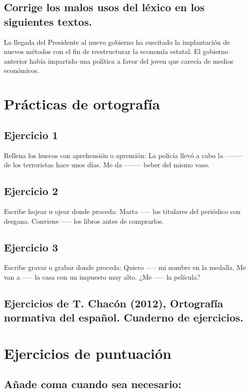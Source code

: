 \documentclass[12pt, a4paper, oneside]{report}
\begin{document}
\section{Corrige los malos usos
  del léxico en los siguientes textos.}
La llegada del Presidente %
al nuevo gobierno ha suscitado %
la implantación de nuevos métodos con el ﬁn de reestructurar
la economía estatal.
El gobierno anterior había impartido una %
política a favor del joven %
que carecía de medios económicos.
\clearpage

\chapter*{Prácticas de ortografía}
\setcounter{chapter}{3}
\setcounter{section}{0}

\section{Ejercicio 1}
Rellena los huecos con
aprehensión o aprensión:
La policía llevó a cabo la --------
de los terroristas hace unos días.
Me da -------- beber del mismo
vaso.

\section{Ejercicio 2}
Escribe hojear u ojear donde
proceda:
Marta ----- los titulares del
periódico con desgana.
Conviene ----- los libros antes de
comprarlos.

\section{Ejercicio 3}
Escribe gravar o grabar donde
proceda:
Quiero ----- mi nombre en la medalla.
Me van a ----- la casa con un impuesto
muy alto.
¿Me ----- la película?

\section{Ejercicios de T. Chacón (2012), Ortografía
  normativa del español. Cuaderno de
  ejercicios.}
\clearpage

\chapter*{Ejercicios de puntuación}
\setcounter{chapter}{4}
\setcounter{section}{0}

\section{Añade coma cuando sea necesario:}
\end{document}
